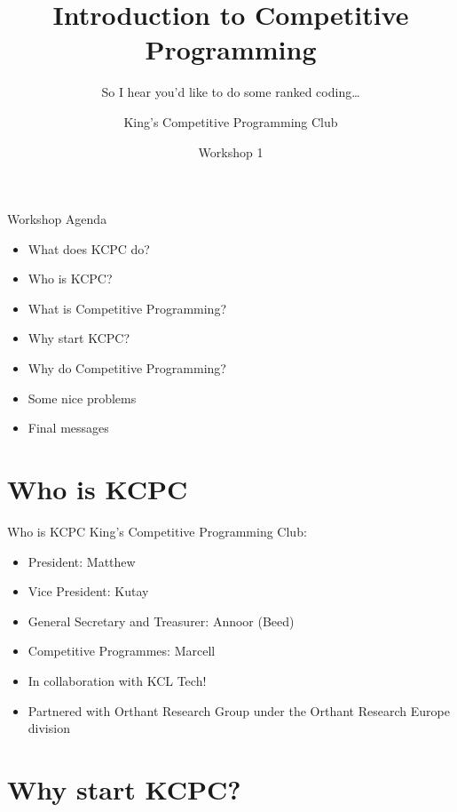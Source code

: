 \documentclass{beamer}
\title{Introduction to Competitive Programming}
\subtitle{So I hear you’d like to do some ranked coding\dots}
\author{King's Competitive Programming Club}
\date{Workshop 1}
\begin{document}
\begin{frame}[plain]
    \titlepage
\end{frame}

\begin{frame}{Workshop Agenda}
    \begin{itemize}
        \item What does KCPC do?
        \item Who is KCPC?
        \item What is Competitive Programming?
        \item Why start KCPC?
        \item Why do Competitive Programming?
        \item Some nice problems
        \item Final messages
    \end{itemize}
\end{frame}

\section{Who is KCPC}

\begin{frame}{Who is KCPC}
    King’s Competitive Programming Club:
    \vspace{0.5em}
    \begin{itemize}
        \item President: Matthew
        \pause
        \item Vice President: Kutay
        \pause
        \item General Secretary and Treasurer: Annoor (Beed)
        \pause
        \item Competitive Programmes: Marcell
        \pause
        \item In collaboration with KCL Tech!
        \pause
        \item Partnered with Orthant Research Group under the Orthant Research Europe division
    \end{itemize}
\end{frame}

\section{Why start KCPC?}
\end{document}
